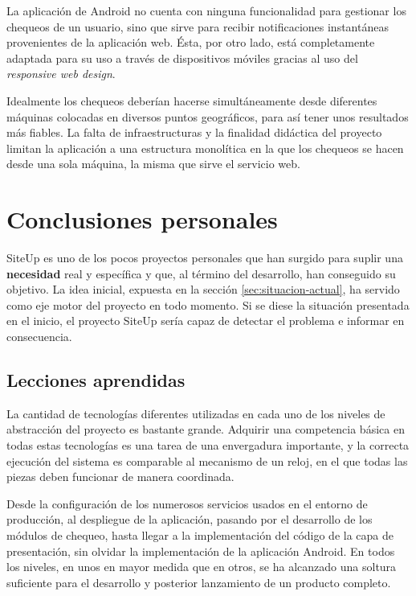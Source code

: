 La aplicación de Android no cuenta con ninguna funcionalidad para gestionar los
chequeos de un usuario, sino que sirve para recibir notificaciones instantáneas
provenientes de la aplicación web. Ésta, por otro lado, está completamente
adaptada para su uso a través de dispositivos móviles gracias al uso del
\textit{responsive web design}.

Idealmente los chequeos deberían hacerse simultáneamente desde diferentes
máquinas colocadas en diversos puntos geográficos, para así tener unos
resultados más fiables. La falta de infraestructuras y la finalidad didáctica
del proyecto limitan la aplicación a una estructura monolítica en la que los
chequeos se hacen desde una sola máquina, la misma que sirve el servicio web.

\section{Conclusiones personales}

SiteUp es uno de los pocos proyectos personales que han surgido para suplir una
\textbf{necesidad} real y específica y que, al término del desarrollo, han
conseguido su objetivo. La idea inicial, expuesta en la sección
\ref{sec:situacion-actual}, ha servido como eje motor del proyecto en todo
momento. Si se diese la situación presentada en el inicio, el proyecto SiteUp
sería capaz de detectar el problema e informar en consecuencia. 

\subsection{Lecciones aprendidas}

La cantidad de tecnologías diferentes utilizadas en cada uno de los niveles de
abstracción del proyecto es bastante grande. Adquirir una competencia básica en
todas estas tecnologías es una tarea de una envergadura importante, y la
correcta ejecución del sistema es comparable al mecanismo de un reloj, en el que
todas las piezas deben funcionar de manera coordinada.

Desde la configuración de los numerosos servicios usados en el entorno de
producción, al despliegue de la aplicación, pasando por el desarrollo de los
módulos de chequeo, hasta llegar a la implementación del código de la capa de
presentación, sin olvidar la implementación de la aplicación Android. En todos
los niveles, en unos en mayor medida que en otros, se ha alcanzado una soltura
suficiente para el desarrollo y posterior lanzamiento de un producto completo.

